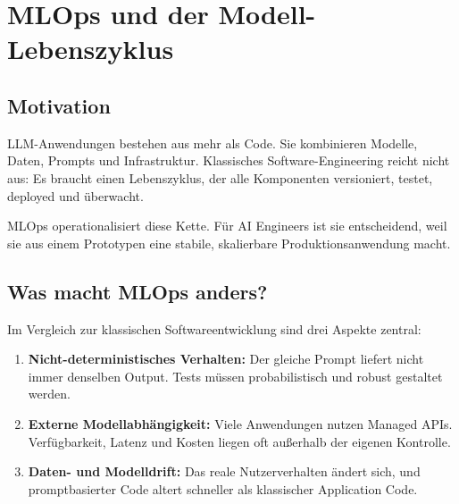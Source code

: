 \chapter{MLOps und der Modell-Lebenszyklus}
\label{chap:mlops_modelllebenszyklus}


\section{Motivation}

LLM-Anwendungen bestehen aus mehr als Code. Sie kombinieren Modelle, Daten, Prompts und Infrastruktur. Klassisches Software-Engineering reicht nicht aus: Es braucht einen Lebenszyklus, der alle Komponenten versioniert, testet, deployed und überwacht.

MLOps operationalisiert diese Kette. Für AI Engineers ist sie entscheidend, weil sie aus einem Prototypen eine stabile, skalierbare Produktionsanwendung macht.

\section{Was macht MLOps anders?}

Im Vergleich zur klassischen Softwareentwicklung sind drei Aspekte zentral:

\begin{enumerate}[leftmargin=*]
    \item \textbf{Nicht-deterministisches Verhalten:} Der gleiche Prompt liefert nicht immer denselben Output. Tests müssen probabilistisch und robust gestaltet werden.
    \item \textbf{Externe Modellabhängigkeit:} Viele Anwendungen nutzen Managed APIs. Verfügbarkeit, Latenz und Kosten liegen oft außerhalb der eigenen Kontrolle.
    \item \textbf{Daten- und Modelldrift:} Das reale Nutzerverhalten ändert sich, und promptbasierter Code altert schneller als klassischer Application Code.
\end{enumerate}

